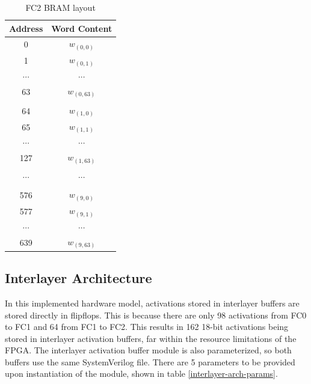 \begin{table}
	\centering
	\begin{tabular}{|c|c|}
		\hline
		\textbf{Address} & \textbf{Word Content} \\\hline
		0 & $w_{(0, 0)}$\\
		1 & $w_{(0, 1)}$\\
		$\cdots$ & $\cdots$ \\			
		63 & $w_{(0, 63)}$\\
		& \\
		64 & $w_{(1, 0)}$ \\
		65 & $w_{(1, 1)}$ \\
		$\cdots$ & $\cdots$ \\	
		127 & $w_{(1, 63)}$\\
		& \\
		$\cdots$ & $\cdots$ \\	
		& \\ 
		576 & $w_{(9, 0)}$ \\
		577 & $w_{(9, 1)}$ \\
		$\cdots$ & $\cdots$ \\			
		639 & $w_{(9, 63)}$ \\
		\hline
	\end{tabular}	
	\caption{FC2 BRAM layout}	
	\label{fc2-bram}
\end{table}

\subsection{Interlayer Architecture}
In this implemented hardware model, activations stored in interlayer buffers are stored directly in flipflops. This is because there are only 98 activations from FC0 to FC1 and 64 from FC1 to FC2. This results in 162 18-bit activations being stored in interlayer activation buffers, far within the resource limitations of the FPGA.  The interlayer activation buffer module is also parameterized, so both buffers use the same SystemVerilog file. There are 5 parameters to be provided upon instantiation of the module, shown in table \ref{interlayer-arch-params}.

